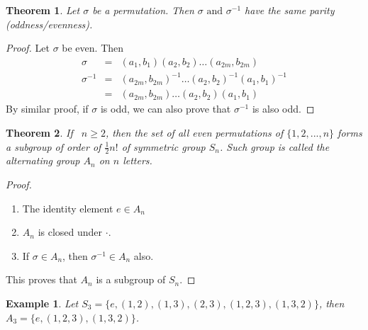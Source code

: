 \documentclass{article}
\theoremstyle{MyNonumberplain}
\theoremstyle{break}
\newtheorem*{proof}{Proof. }
\newcommand{\infixand}{\text{ and }}
\theoremstyle{break}
\newtheorem{theorem}{Theorem}[section]
\newtheorem{example}{Example}[section]
\theoremstyle{break}
\theoremstyle{definition}
\theoremstyle{break}
\begin{document}
\begin{thmbox}
    \begin{theorem}
        Let $\sigma$ be a permutation. Then $\sigma \infixand \sigma^{- 1}$ have the same parity (oddness/evenness).
    \end{theorem}
    \begin{prfbox}
        \begin{proof}
            Let $\sigma$ be even. Then
            \begin{eqnarray*}
              \sigma & = & (a_1, b_1) (a_2, b_2) \ldots (a_{2 m}, b_{2 m})\\
              \sigma^{- 1} & = & (a_{2 m}, b_{2 m})^{- 1} \ldots (a_2, b_2)^{- 1} (a_1,
              b_1)^{- 1}\\
              & = & (a_{2 m}, b_{2 m}) \ldots (a_2, b_2) (a_1, b_1)
            \end{eqnarray*}
            By similar proof, if $\sigma$ is odd, we can also prove that $\sigma^{- 1}$ is
            also odd.
        \end{proof}
    \end{prfbox}
\end{thmbox}

\begin{thmbox}
    \begin{theorem}
        If \ $n \geq 2$, then the set of all even permutations of $\{1, 2, . . ., n\}$
        forms a subgroup of order of $\frac{1}{2} n!$ of
        symmetric group $S_n$. Such group is called the alternating group $A_n$ on $n$
        letters.
    \end{theorem}
    \begin{prfbox}
        \begin{proof}
            \begin{enumerate}
                \item The identity element $e \in A_n$\\
                \item $A_n$ is closed under $\cdot$.\bigskip
                \item If $\sigma \in A_n$, then $\sigma^{- 1} \in A_n$ also.\bigskip
            \end{enumerate}
            This proves that $A_n$ is a subgroup of $S_n$. 
        \end{proof}
    \end{prfbox}
\end{thmbox}

\begin{expbox}
    \begin{example}
        Let $S_3 = \{ e, (1, 2), (1, 3), (2, 3), (1, 2, 3), (1, 3, 2) \}$, then $A_3 =\{ e, (1, 2, 3), (1, 3, 2) \}$.
    \end{example}
\end{expbox}
\end{document}

